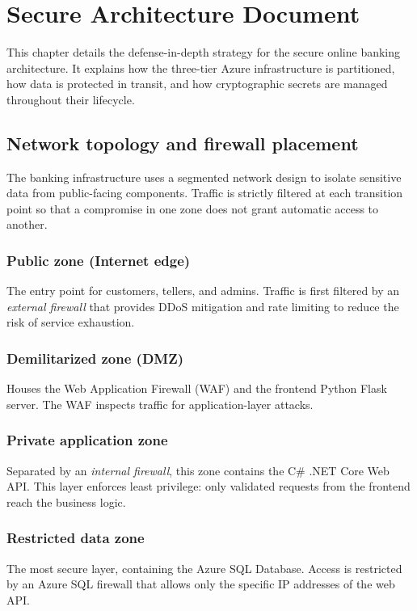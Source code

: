 \chapter{Secure Architecture Document}
\label{ch:secure-arch}

This chapter details the defense-in-depth strategy for the secure online banking architecture. It explains how the three-tier Azure infrastructure is partitioned, how data is protected in transit, and how cryptographic secrets are managed throughout their lifecycle.

\section{Network topology and firewall placement}

The banking infrastructure uses a segmented network design to isolate sensitive data from public-facing components. Traffic is strictly filtered at each transition point so that a compromise in one zone does not grant automatic access to another.

\subsection*{Public zone (Internet edge)}
The entry point for customers, tellers, and admins. Traffic is first filtered by an \emph{external firewall} that provides DDoS mitigation and rate limiting to reduce the risk of service exhaustion.

\subsection*{Demilitarized zone (DMZ)}
Houses the Web Application Firewall (WAF) and the frontend Python Flask server. The WAF inspects traffic for application-layer attacks.

\subsection*{Private application zone}
Separated by an \emph{internal firewall}, this zone contains the C\# .NET Core Web API. This layer enforces least privilege: only validated requests from the frontend reach the business logic.

\subsection*{Restricted data zone}
The most secure layer, containing the Azure SQL Database. Access is restricted by an Azure SQL firewall that allows only the specific IP addresses of the web API.

